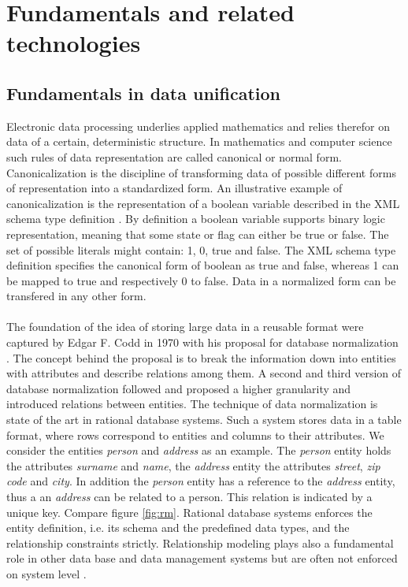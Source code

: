 \chapter{Fundamentals and related technologies\label{cha:chapter2}}

\section{Fundamentals in data unification\label{sec:unification}}

Electronic data processing underlies applied mathematics and relies therefor on data of a certain, deterministic structure. In mathematics and computer science such rules of data representation are called canonical or normal form. Canonicalization is the discipline of transforming data of possible different forms of representation into a standardized form. An illustrative example of canonicalization is the representation of a boolean variable described in the XML schema type definition \cite{xml_schema_2017}. By definition a boolean variable supports binary logic representation, meaning that some state or flag can either be true or false. The set of possible literals might contain: 1, 0, true and false. The XML schema type definition specifies the canonical form of boolean as true and false, whereas 1 can be mapped to true and respectively 0 to false. Data in a normalized form can be transfered in any other form.
\\\\
The foundation of the idea of storing large data in a reusable format were captured by Edgar F. Codd in 1970 with his proposal for database normalization \cite{codd_1970}. The concept behind the proposal is to break the information down into entities with attributes and describe relations among them. A second and third version of database normalization followed and proposed a higher granularity and introduced relations between entities. The technique of data normalization is state of the art in rational database systems. Such a system stores data in a table format, where rows correspond to entities and columns to their attributes. We consider the entities \textit{person} and \textit{address} as an example. The \textit{person} entity holds the attributes \textit{surname} and \textit{name}, the \textit{address} entity the attributes \textit{street}, \textit{zip code} and \textit{city}. In addition the \textit{person} entity has a reference to the \textit{address} entity, thus a an \textit{address} can be related to a person. This relation is indicated by a unique key. Compare figure \ref{fig:rm}. Rational database systems enforces the entity definition, i.e. its schema and the predefined data types, and the relationship constraints strictly. Relationship modeling plays also a fundamental role in other data base and data management systems but are often not enforced on system level \cite{hills_2016}.

